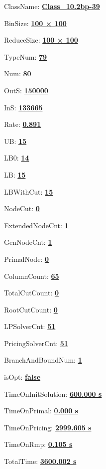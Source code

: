 \documentclass[11pt]{article}
\begin{document}
\pagestyle{empty}


ClassName: \underline{\textbf{Class_10.2bp-39}}
\par
BinSize: \underline{\textbf{100 × 100}}
\par
ReduceSize: \underline{\textbf{100 × 100}}
\par
TypeNum: \underline{\textbf{79}}
\par
Num: \underline{\textbf{80}}
\par
OutS: \underline{\textbf{150000}}
\par
InS: \underline{\textbf{133665}}
\par
Rate: \underline{\textbf{0.891}}
\par
UB: \underline{\textbf{15}}
\par
LB0: \underline{\textbf{14}}
\par
LB: \underline{\textbf{15}}
\par
LBWithCut: \underline{\textbf{15}}
\par
NodeCut: \underline{\textbf{0}}
\par
ExtendedNodeCnt: \underline{\textbf{1}}
\par
GenNodeCnt: \underline{\textbf{1}}
\par
PrimalNode: \underline{\textbf{0}}
\par
ColumnCount: \underline{\textbf{65}}
\par
TotalCutCount: \underline{\textbf{0}}
\par
RootCutCount: \underline{\textbf{0}}
\par
LPSolverCnt: \underline{\textbf{51}}
\par
PricingSolverCnt: \underline{\textbf{51}}
\par
BranchAndBoundNum: \underline{\textbf{1}}
\par
isOpt: \underline{\textbf{false}}
\par
TimeOnInitSolution: \underline{\textbf{600.000 s}}
\par
TimeOnPrimal: \underline{\textbf{0.000 s}}
\par
TimeOnPricing: \underline{\textbf{2999.605 s}}
\par
TimeOnRmp: \underline{\textbf{0.105 s}}
\par
TotalTime: \underline{\textbf{3600.002 s}}
\par
\newpage


\end{document}
